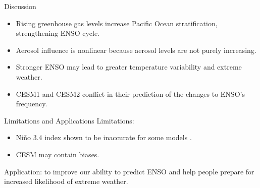 \documentclass{beamer}
\begin{document}

\begin{frame}{Discussion}
  \begin{itemize}
  \item Rising greenhouse gas levels increase Pacific Ocean stratification, strengthening ENSO cycle.
  \item Aerosol influence is nonlinear because aerosol levels are not purely increasing.
  \item Stronger ENSO may lead to greater temperature variability and extreme weather.
  \item CESM1 and CESM2 conflict in their prediction of the changes to ENSO's frequency.
  \end{itemize}
\end{frame}

\begin{frame}{Limitations and Applications}
  Limitations:
  \begin{itemize}
  \item Niño 3.4 index shown to be inaccurate for some models \citep{cai2018increased}.
  \item CESM may contain biases.
  \end{itemize}
  Application: to improve our ability to predict ENSO and help people prepare for increased likelihood of extreme weather.
\end{frame}

\end{document}
